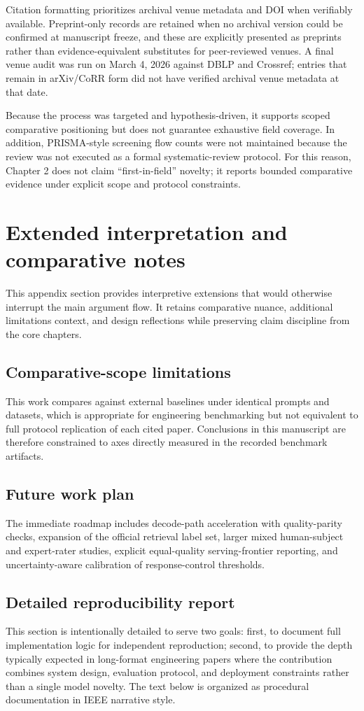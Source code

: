 ﻿\documentclass[a4paper,12pt]{article}
\begin{document}
Citation formatting prioritizes archival venue metadata and DOI when verifiably available. Preprint-only records are retained when no archival version could be confirmed at manuscript freeze, and these are explicitly presented as preprints rather than evidence-equivalent substitutes for peer-reviewed venues. A final venue audit was run on March 4, 2026 against DBLP and Crossref; entries that remain in arXiv/CoRR form did not have verified archival venue metadata at that date.

Because the process was targeted and hypothesis-driven, it supports scoped comparative positioning but does not guarantee exhaustive field coverage. In addition, PRISMA-style screening flow counts were not maintained because the review was not executed as a formal systematic-review protocol. For this reason, Chapter 2 does not claim ``first-in-field'' novelty; it reports bounded comparative evidence under explicit scope and protocol constraints.

\section{Extended interpretation and comparative notes}
This appendix section provides interpretive extensions that would otherwise interrupt the main argument flow. It retains comparative nuance, additional limitations context, and design reflections while preserving claim discipline from the core chapters.
\subsection{Comparative-scope limitations}
This work compares against external baselines under identical prompts and datasets, which is appropriate for engineering benchmarking but not equivalent to full protocol replication of each cited paper. Conclusions in this manuscript are therefore constrained to axes directly measured in the recorded benchmark artifacts.

\subsection{Future work plan}
The immediate roadmap includes decode-path acceleration with quality-parity checks, expansion of the official retrieval label set, larger mixed human-subject and expert-rater studies, explicit equal-quality serving-frontier reporting, and uncertainty-aware calibration of response-control thresholds.

\subsection{Detailed reproducibility report}
This section is intentionally detailed to serve two goals: first, to document full implementation logic for independent reproduction; second, to provide the depth typically expected in long-format engineering papers where the contribution combines system design, evaluation protocol, and deployment constraints rather than a single model novelty. The text below is organized as procedural documentation in IEEE narrative style.
\end{document}
